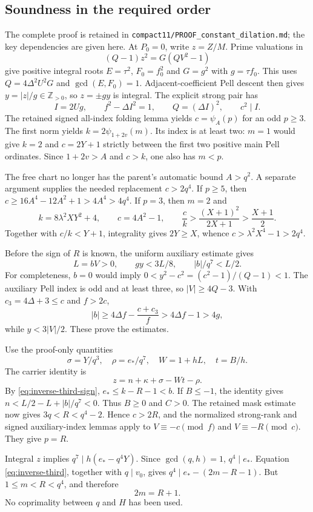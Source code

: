 \subsection{Soundness in the required order}
The complete proof is retained in
\texttt{compact11/PROOF\_constant\_dilation.md}; the key dependencies are given here.
At $P_0=0$, write $z=Z/M$. Prime valuations in
\[
 (Q-1)z^2=G(QV^2-1)
\]
give positive integral roots $E=\tau^2$, $F_0=f_0^2$ and
$G=g^2$ with $g=\tau f_0$. This uses $Q=4\Delta^2U^2G$ and
$\gcd(E,F_0)=1$. Adjacent-coefficient Pell descent then gives
$y=|z|/g\in\mathbb Z_{>0}$, so $z=\pm gy$ is integral.
The explicit strong pair has
\[
 I=2Ug,\qquad f^2-\Delta I^2=1,\qquad Q=(\Delta I)^2,\qquad c^2\mid I.
\]
The retained signed all-index folding lemma yields
$c=\psi_A(p)$ for an odd $p\ge3$. The first norm yields
$k=2\psi_{1+2v}(m)$. Its index is at least two: $m=1$ would give
$k=2$ and $c=2Y+1$ strictly between the first two positive main Pell
ordinates. Since $1+2v>A$ and $c>k$, one also has $m<p$.

The free chart no longer has the parent's automatic bound $A>q^2$.
A separate argument supplies the needed replacement $c>2q^4$.
If $p\ge5$, then $c\ge16A^4-12A^2+1>4A^4>4q^4$.
If $p=3$, then $m=2$ and
\[
 k=8\lambda^2XY^2+4,\qquad c=4A^2-1,\qquad
 \frac ck>\frac{(X+1)^2}{2X+1}>\frac{X+1}{2}.
\]
Together with $c/k<Y+1$, integrality gives $2Y\ge X$, whence
$c>\lambda^2X^4-1>2q^4$.

Before the sign of $R$ is known, the uniform auxiliary estimate gives
\[
 L=bV>0,\qquad gy<3L/8,\qquad |b|/q^7<L/2.
\]
For completeness, $b=0$ would imply
$0<y^2-c^2=(c^2-1)/(Q-1)<1$. The auxiliary Pell index is odd and at
least three, so $|V|\ge4Q-3$. With $c_3=4\Delta+3\le c$ and $f>2c$,
\[
 |b|\ge4\Delta f-\frac{c+c_3}{f}>4\Delta f-1>4g,
\]
while $y<3|V|/2$. These prove the estimates.

Use the proof-only quantities
\[
 \sigma=Y/q^3,\quad \rho=e_*/q^7,\quad W=1+hL,\quad t=B/h.
\]
The carrier identity is
\[
 z=n+\kappa+\sigma-Wt-\rho.
\]
By \eqref{eq:inverse-third-sign}, $e_*\le k-R-1<b$.
If $B\le-1$, the identity gives
$n<L/2-L+|b|/q^7<0$. Thus $B\ge0$ and $C>0$.
The retained mask estimate now gives $3q<R<q^4-2$.
Hence $c>2R$, and the normalized strong-rank and signed auxiliary-index
lemmas apply to $V\equiv-c\pmod f$ and $V\equiv-R\pmod c$.
They give $p=R$.

Integral $z$ implies $q^7\mid h(e_*-q^4Y)$. Since $\gcd(q,h)=1$,
$q^4\mid e_*$. Equation \eqref{eq:inverse-third}, together with $q\mid v_0$,
gives $q^4\mid e_*-(2m-R-1)$. But $1\le m<R<q^4$, and therefore
\[
 2m=R+1.
\]
No coprimality between $q$ and $H$ has been used.


